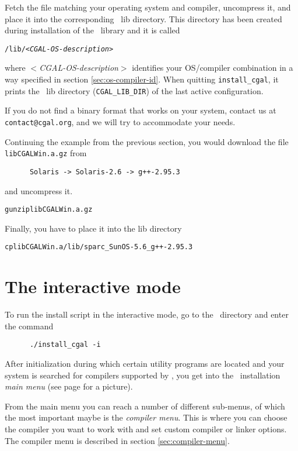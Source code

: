 Fetch the file matching your operating system and compiler, uncompress
it, and place it into the corresponding \cgal\ lib directory. This
directory has been created during installation of the \cgal\ library
and it is called
\begin{alltt}
      \cgaldir/lib/<\textit{CGAL-OS-description}>
\end{alltt}
where $<$\textit{CGAL-OS-description}$>$ identifies your OS/compiler
combination in a way specified in section \ref{sec:os-compiler-id}.
When quitting \texttt{install\_cgal}, it prints the \cgal\ lib
directory (\texttt{CGAL\_LIB\_DIR}) of the
last active configuration.

If you do not find a binary format that works on your system, contact
us at \texttt{contact@cgal.org}, and we will try to accommodate your
needs.

Continuing the example from the previous section, you would download
the file \texttt{libCGALWin.a.gz} from 
\begin{verbatim}
      Solaris -> Solaris-2.6 -> g++-2.95.3
\end{verbatim}
and uncompress it.
\begin{alltt}
      gunzip libCGALWin.a.gz
\end{alltt}
Finally, you have to place it into the lib directory
\begin{alltt}
      cp libCGALWin.a \cgaldir/lib/sparc_SunOS-5.6_g++-2.95.3
\end{alltt}

\section{The interactive mode}\label{sec:interactive-mode}

To run the install script in the interactive mode, go to the \cgaldir\ 
directory and enter the command
\begin{verbatim}
      ./install_cgal -i
\end{verbatim}

After initialization during which certain utility programs are located
and your system is searched for compilers supported by \cgal, you get
into the \cgal\ installation \textit{main menu} (see page
\pageref{pic:main-menu} for a picture).

From the main menu you can reach a number of different sub-menus, of
which the most important maybe is the \textit{compiler menu}. This is
where you can choose the compiler you want to work with and set custom
compiler or linker options.  The compiler menu is described in section
\ref{sec:compiler-menu}.

